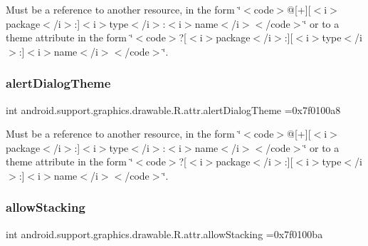 Must be a reference to another resource, in the form \char`\"{}$<$code$>$@\mbox{[}+\mbox{]}\mbox{[}$<$i$>$package$<$/i$>$\+:\mbox{]}$<$i$>$type$<$/i$>$\+:$<$i$>$name$<$/i$>$$<$/code$>$\char`\"{} or to a theme attribute in the form \char`\"{}$<$code$>$?\mbox{[}$<$i$>$package$<$/i$>$\+:\mbox{]}\mbox{[}$<$i$>$type$<$/i$>$\+:\mbox{]}$<$i$>$name$<$/i$>$$<$/code$>$\char`\"{}. \mbox{\label{classandroid_1_1support_1_1graphics_1_1drawable_1_1R_1_1attr_abf88c7181504452275ff9b5692f5547e}} 
\subsubsection{\texorpdfstring{alert\+Dialog\+Theme}{alertDialogTheme}}
{\footnotesize\ttfamily int android.\+support.\+graphics.\+drawable.\+R.\+attr.\+alert\+Dialog\+Theme =0x7f0100a8\hspace{0.3cm}{\ttfamily [static]}}

Must be a reference to another resource, in the form \char`\"{}$<$code$>$@\mbox{[}+\mbox{]}\mbox{[}$<$i$>$package$<$/i$>$\+:\mbox{]}$<$i$>$type$<$/i$>$\+:$<$i$>$name$<$/i$>$$<$/code$>$\char`\"{} or to a theme attribute in the form \char`\"{}$<$code$>$?\mbox{[}$<$i$>$package$<$/i$>$\+:\mbox{]}\mbox{[}$<$i$>$type$<$/i$>$\+:\mbox{]}$<$i$>$name$<$/i$>$$<$/code$>$\char`\"{}. \mbox{\label{classandroid_1_1support_1_1graphics_1_1drawable_1_1R_1_1attr_a7bcce852f8d266e7896e049a3576902e}} 
\subsubsection{\texorpdfstring{allow\+Stacking}{allowStacking}}
{\footnotesize\ttfamily int android.\+support.\+graphics.\+drawable.\+R.\+attr.\+allow\+Stacking =0x7f0100ba\hspace{0.3cm}{\ttfamily [static]}}

